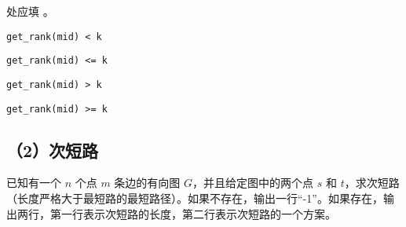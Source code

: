 \documentclass{exam-zh}
\newcommand{\code}[1]{\texttt{#1}}
\begin{document}
\begin{question}
     处应填 \paren[A]。
    \begin{choices}
        \item \code{get\_rank(mid) < k}
        \item \code{get\_rank(mid) <= k}
        \item \code{get\_rank(mid) > k}
        \item \code{get\_rank(mid) >= k}
    \end{choices}
\end{question}





\subsection*{（2）次短路}
已知有一个 $n$ 个点 $m$ 条边的有向图 $G$，并且给定图中的两个点 $s$ 和 $t$，求次短路（长度严格大于最短路的最短路径）。如果不存在，输出一行“-1”。如果存在，输出两行，第一行表示次短路的长度，第二行表示次短路的一个方案。

\newpage
\end{document}
